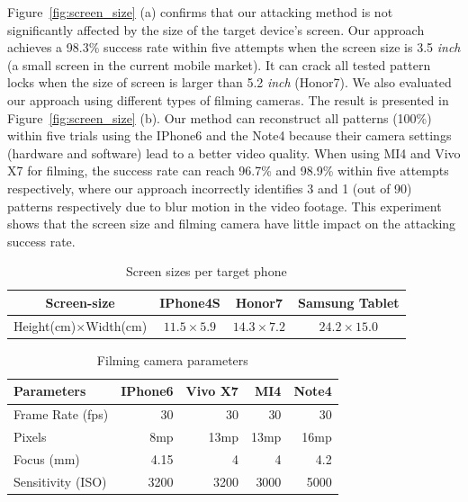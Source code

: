     Figure~\ref{fig:screen_size} (a) confirms that our attacking method
    is not significantly affected by the size of the
     target device's screen. Our approach achieves a 98.3\%  success rate within five
    attempts when the screen size is 3.5 \emph{inch} (a small screen in the current
     mobile market). It can crack all tested pattern locks when
    the size of screen is larger than 5.2 \emph{inch} (Honor7). We also
    evaluated  our approach using different types of filming cameras.
    The result is presented in Figure~\ref{fig:screen_size}
    (b). Our method can reconstruct all patterns (100\%) within five trials using
    the IPhone6 and the Note4 because their camera settings (hardware and software) lead to a better video
    quality.   When using MI4 and Vivo X7 for filming,
     the success rate can reach 96.7\% and 98.9\% within five
    attempts respectively, where our approach incorrectly identifies 3 and 1 (out of
    90) patterns respectively due to blur motion in the video footage.
    This experiment shows that the screen size and filming camera
    have little impact on the attacking success rate.


    \begin{table}[!t]
            \centering
            \caption{Screen sizes per target phone}
            \label{tab:screen-size}
            \scriptsize
            \begin{tabular}{cccc}
                \toprule
                \textbf{Screen-size}& \textbf{IPhone4S }& \textbf{Honor7} & \textbf{Samsung Tablet} \\
                \midrule
                Height(cm)$\times$Width(cm) & $11.5\times5.9$ & $14.3\times7.2$ & $24.2\times15.0$ \\
                \bottomrule
            \end{tabular}
    \end{table}

    \begin{table}[!t]
            \centering
            \caption{Filming camera parameters}
            \label{tab:camera-parameters}
            \small
            \begin{tabular}{lrrrr}
                \toprule
                \textbf{Parameters}& \textbf{IPhone6} & \textbf{Vivo X7} & \textbf{MI4} & \textbf{Note4} \\
                \midrule
                Frame Rate (fps) & $30$ & $30$& $30$ & 30 \\
                Pixels & 8mp & 13mp & 13mp & 16mp \\
                Focus (mm) & 4.15 & 4 & 4 & 4.2 \\
                Sensitivity (ISO) & 3200 & 3200 & 3000 & 5000 \\
                \bottomrule
            \end{tabular}
    \end{table}

